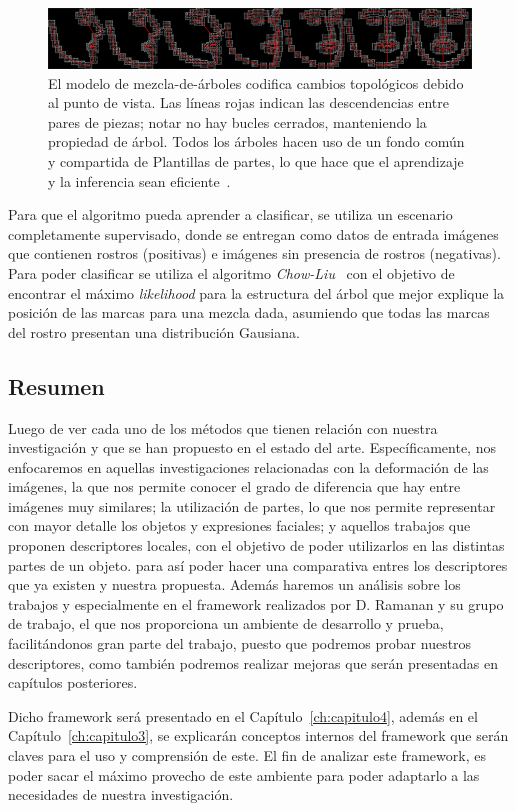 \begin{figure}[tb]
 \centering
  \includegraphics[width=1\textwidth]{Figuras/viewpoints.jpg}
  \caption[Puntos de vista de un rostro]{El modelo de mezcla-de-árboles codifica cambios topológicos debido al punto de vista. Las líneas rojas indican las descendencias entre pares de piezas; notar no hay bucles cerrados, manteniendo la propiedad de árbol. Todos los árboles hacen uso de un fondo común y compartida de Plantillas de partes, lo que hace que el aprendizaje y la inferencia sean eficiente~\cite{Zhu2012}.}
  \label{fig:m-view}
\end{figure}

Para que el algoritmo pueda aprender a clasificar, se utiliza un escenario completamente supervisado, donde se entregan como datos de entrada imágenes que contienen rostros (positivas) e imágenes sin presencia de rostros (negativas). Para poder clasificar se utiliza el algoritmo \textit{Chow-Liu}~\cite{Chow1968} con el objetivo de encontrar el máximo \textit{likelihood} para la estructura del árbol que mejor explique la posición de las marcas para una mezcla dada, asumiendo que todas las marcas del rostro presentan una distribución Gausiana.

\subsection{Resumen}
Luego de ver cada uno de los métodos que tienen relación con nuestra investigación y que se han propuesto en el estado del arte. Específicamente, nos enfocaremos en aquellas investigaciones relacionadas con la deformación de las imágenes, la que nos permite conocer el grado de diferencia que hay entre imágenes muy similares; la utilización de partes, lo que nos permite representar con mayor detalle los objetos y expresiones faciales; y aquellos trabajos que proponen descriptores locales, con el objetivo de poder utilizarlos en las distintas partes de un objeto. para así poder hacer una comparativa entres los descriptores que ya existen y nuestra propuesta. Además haremos un análisis sobre los trabajos y especialmente en el framework realizados por D. Ramanan y su grupo de trabajo, el que nos proporciona un ambiente de desarrollo y prueba, facilitándonos gran parte del trabajo, puesto que podremos probar nuestros descriptores, como también podremos realizar mejoras que serán presentadas en capítulos posteriores.

Dicho framework será presentado en el Capítulo~\ref{ch:capitulo4}, además en el Capítulo~\ref{ch:capitulo3}, se explicarán conceptos internos del framework que serán claves para el uso y comprensión de este. El fin de analizar este framework, es poder sacar el máximo provecho de este ambiente para poder adaptarlo a las necesidades de nuestra investigación.




